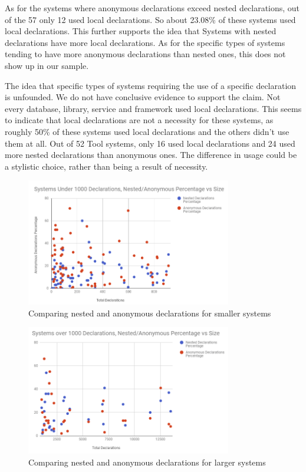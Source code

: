 \documentclass[12p]{article}
\begin{document}
As for the systems where anonymous declarations exceed nested declarations, out of the 57 only 12 used local declarations. So about 23.08\% of these systems used local declarations. This further supports the idea that Systems with nested declarations have more local declarations. As for the specific types of systems tending to have more anonymous declarations than nested ones, this does not show up in our sample.

The idea that specific types of systems requiring the use of a specific declaration is unfounded. We do not have conclusive evidence to support the claim. Not every database, library, service and framework used local declarations. This seems to indicate that local declarations are not a necessity for these systems, as roughly 50\% of these systems used local declarations and the others didn’t use them at all. Out of 52 Tool systems, only 16 used local declarations and 24 used more nested declarations than anonymous ones. The difference in usage could be a stylistic choice, rather than being a result of necessity.

\begin{figure}[H]
  \begin{center}
    \includegraphics[width=0.8\textwidth]{Under1000.PNG}
    \caption{Comparing nested and anonymous declarations for smaller systems}
    \label{fig:Under1000}
  \end{center}
\end{figure}

\begin{figure}[H]
  \begin{center}
    \includegraphics[width=0.8\textwidth]{Over1000.PNG}
    \caption{Comparing nested and anonymous declarations for larger systems}
    \label{fig:Over1000}
  \end{center}
\end{figure}
\end{document}
